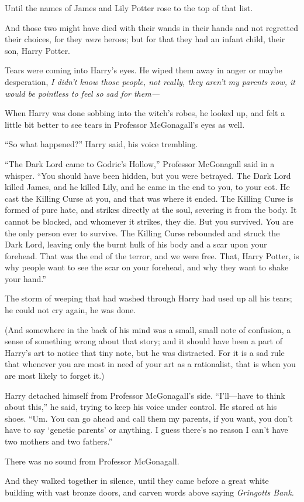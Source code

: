 Until the names of James and Lily Potter rose to the top of that list.

And those two might have died with their wands in their hands and not regretted their choices, for they \emph{were} heroes; but for that they had an infant child, their son, Harry Potter.

Tears were coming into Harry’s eyes. He wiped them away in anger or maybe desperation, \emph{I didn’t know those people, not really, they aren’t my parents \emph{now}, it would be pointless to feel so sad for them—}

When Harry was done sobbing into the witch’s robes, he looked up, and felt a little bit better to see tears in Professor McGonagall’s eyes as well.

“So what happened?” Harry said, his voice trembling.

“The Dark Lord came to Godric’s Hollow,” Professor McGonagall said in a whisper.
“You should have been hidden, but you were betrayed. The Dark Lord killed James, and he killed Lily, and he came in the end to you, to your cot. He cast the Killing Curse at you, and that was where it ended. The Killing Curse is formed of pure hate, and strikes directly at the soul, severing it from the body. It cannot be blocked, and whomever it strikes, they die. But you survived. You are the only person ever to survive. The Killing Curse rebounded and struck the Dark Lord, leaving only the burnt hulk of his body and a scar upon your forehead. That was the end of the terror, and we were free. That, Harry Potter, is why people want to see the scar on your forehead, and why they want to shake your hand.”

The storm of weeping that had washed through Harry had used up all his tears; he could not cry again, he was done.

(And somewhere in the back of his mind was a small, small note of confusion, a sense of something wrong about that story; and it should have been a part of Harry’s art to notice that tiny note, but he was distracted. For it is a sad rule that whenever you are most in need of your art as a rationalist, that is when you are most likely to forget it.)

Harry detached himself from Professor McGonagall’s side.
“I’ll—have to think about this,” he said, trying to keep his voice under control. He stared at his shoes.
“Um. You can go ahead and call them my parents, if you want, you don’t have to say ‘genetic parents’ or anything. I guess there’s no reason I can’t have two mothers and two fathers.”

There was no sound from Professor McGonagall.

And they walked together in silence, until they came before a great white building with vast bronze doors, and carven words above saying \emph{Gringotts Bank.}

